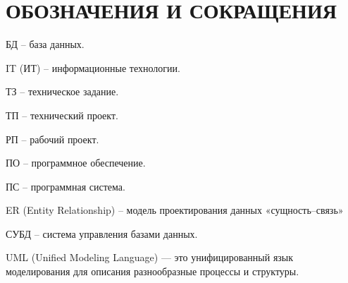\section*{ОБОЗНАЧЕНИЯ И СОКРАЩЕНИЯ}

БД -- база данных.

IT (ИТ) -- информационные технологии. 

ТЗ -- техническое задание.

ТП -- технический проект.

РП -- рабочий проект.

ПО -- программное обеспечение.

ПС -- программная система.

ER (Entity Relationship) -- модель проектирования данных «сущность--связь»

СУБД -- система управления базами данных.

UML (Unified Modeling Language) — это унифицированный язык моделирования для описания разнообразные процессы и структуры.